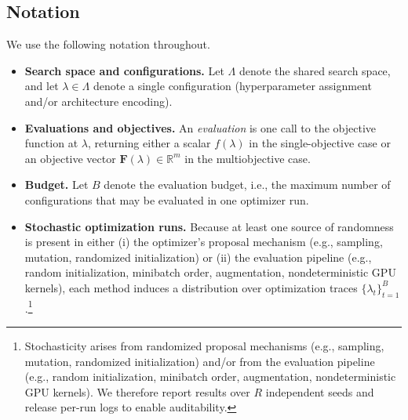 \subsection*{Notation}
We use the following notation throughout.

\begin{itemize}
    \item \textbf{Search space and configurations.}
    Let \(\Lambda\) denote the shared search space, and let \(\lambda \in \Lambda\) denote a single configuration
    (hyperparameter assignment and/or architecture encoding).

    \item \textbf{Evaluations and objectives.}
    An \emph{evaluation} is one call to the objective function at \(\lambda\), returning either
    a scalar \(f(\lambda)\) in the single-objective case or an objective vector
    \(\mathbf{F}(\lambda) \in \mathbb{R}^m\) in the multiobjective case.
    \ObjectiveDirectionNote{}

    \item \textbf{Budget.}
    Let \(B\) denote the evaluation budget, i.e., the maximum number of configurations that may be evaluated in one optimizer run.

    \item \textbf{Stochastic optimization runs.}
    Because at least one source of randomness is present in either (i) the optimizer’s proposal mechanism (e.g., sampling, mutation, randomized initialization) or (ii) the evaluation pipeline (e.g., random initialization, minibatch order, augmentation, nondeterministic GPU kernels), each method induces a distribution over optimization traces \(\{\lambda_t\}_{t=1}^{B}\).\footnote{Stochasticity arises from randomized proposal mechanisms (e.g., sampling, mutation, randomized initialization) and/or from the evaluation pipeline (e.g., random initialization, minibatch order, augmentation, nondeterministic GPU kernels). We therefore report results over \(R\) independent seeds and release per-run logs to enable auditability.}

\end{itemize}
